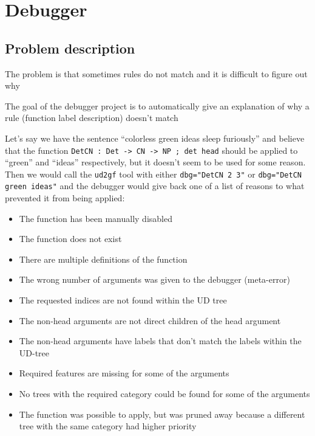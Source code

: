 \chapter{Debugger}

\section{Problem description}

The problem is that sometimes rules do not match and it is difficult to figure out why

The goal of the debugger project is to automatically give an explanation of why a rule (function label description) doesn't match




Let's say we have the sentence ``colorless green ideas sleep furiously'' and believe that the function \verb|DetCN : Det -> CN -> NP ; det head| should be applied to ``green'' and ``ideas'' respectively, but it doesn't seem to be
used for some reason. Then we would call the \texttt{ud2gf} tool with either \verb|dbg="DetCN 2 3"| or \verb|dbg="DetCN green ideas"| and the debugger would give back one of a list of reasons to what prevented it from being applied:

\begin{itemize}
    \item The function has been manually disabled
    \item The function does not exist
    \item There are multiple definitions of the function
    \item The wrong number of arguments was given to the debugger (meta-error)
    \item The requested indices are not found within the UD tree
    \item The non-head arguments are not direct children of the head argument
    \item The non-head arguments have labels that don't match the labels within the UD-tree
    \item Required features are missing for some of the arguments
    \item No trees with the required category could be found for some of the arguments
    \item The function was possible to apply, but was pruned away because a different tree with the same category had higher priority
\end{itemize}

